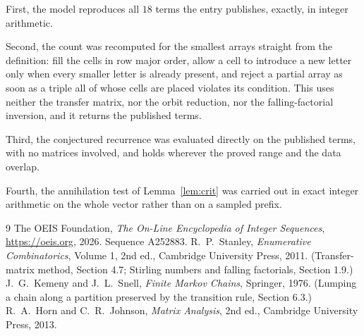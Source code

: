 \documentclass[11pt,a4paper]{article}
\theoremstyle{plain}
\theoremstyle{definition}
\begin{document}
First, the model reproduces all $18$ terms the entry publishes, exactly, in integer
arithmetic.

Second, the count was recomputed for the smallest arrays straight from the definition: fill the
cells in row major order, allow a cell to introduce a new letter only when every smaller letter
is already present, and reject a partial array as soon as a triple all of whose cells are
placed violates its condition. This uses neither the transfer matrix, nor the orbit reduction,
nor the falling-factorial inversion, and it returns the published terms.

Third, the conjectured recurrence was evaluated directly on the published terms, with no
matrices involved, and holds wherever the proved range and the data overlap.

Fourth, the annihilation test of Lemma~\ref{lem:crit} was carried out in exact integer
arithmetic on the whole vector rather than on a sampled prefix.

\begin{thebibliography}{9}
 The OEIS Foundation, \emph{The On-Line Encyclopedia of Integer
Sequences}, \url{https://oeis.org}, 2026. Sequence A252883.
 R.~P.~Stanley, \emph{Enumerative Combinatorics}, Volume 1, 2nd ed.,
Cambridge University Press, 2011. (Transfer-matrix method, Section 4.7; Stirling numbers and
falling factorials, Section 1.9.)
 J.~G.~Kemeny and J.~L.~Snell, \emph{Finite Markov Chains}, Springer,
1976. (Lumping a chain along a partition preserved by the transition rule, Section 6.3.)
 R.~A.~Horn and C.~R.~Johnson, \emph{Matrix Analysis}, 2nd ed., Cambridge
University Press, 2013.
\end{thebibliography}
\end{document}
